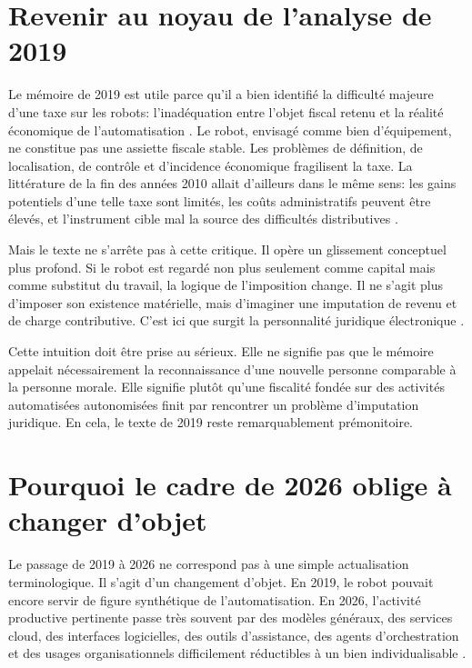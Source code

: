 \documentclass[11pt]{article}
\begin{document}
\section{Revenir au noyau de l'analyse de 2019}
Le m{\'e}moire de 2019 est utile parce qu'il a bien identifi{\'e} la difficult{\'e} majeure d'une taxe sur les robots: l'inad{\'e}quation entre l'objet fiscal retenu et la r{\'e}alit{\'e} {\'e}conomique de l'automatisation \citep{graz2019}. Le robot, envisag{\'e} comme bien d'{\'e}quipement, ne constitue pas une assiette fiscale stable. Les probl{\`e}mes de d{\'e}finition, de localisation, de contr{\^o}le et d'incidence {\'e}conomique fragilisent la taxe. La litt{\'e}rature de la fin des ann{\'e}es 2010 allait d'ailleurs dans le m{\^e}me sens: les gains potentiels d'une telle taxe sont limit{\'e}s, les co{\^u}ts administratifs peuvent {\^e}tre {\'e}lev{\'e}s, et l'instrument cible mal la source des difficult{\'e}s distributives \citep{guerreiro2019,thuemmel2018,gasteiger2017,acemoglu2018modeling}.

Mais le texte ne s'arr{\^e}te pas {\`a} cette critique. Il op{\`e}re un glissement conceptuel plus profond. Si le robot est regard{\'e} non plus seulement comme capital mais comme substitut du travail, la logique de l'imposition change. Il ne s'agit plus d'imposer son existence mat{\'e}rielle, mais d'imaginer une imputation de revenu et de charge contributive. C'est ici que surgit la personnalit{\'e} juridique {\'e}lectronique \citep{graz2019,oberson2017}.

Cette intuition doit {\^e}tre prise au s{\'e}rieux. Elle ne signifie pas que le m{\'e}moire appelait n{\'e}cessairement la reconnaissance d'une nouvelle personne comparable {\`a} la personne morale. Elle signifie plut{\^o}t qu'une fiscalit{\'e} fond{\'e}e sur des activit{\'e}s automatis{\'e}es autonomis{\'e}es finit par rencontrer un probl{\`e}me d'imputation juridique. En cela, le texte de 2019 reste remarquablement pr{\'e}monitoire.

\section{Pourquoi le cadre de 2026 oblige {\`a} changer d'objet}
Le passage de 2019 {\`a} 2026 ne correspond pas {\`a} une simple actualisation terminologique. Il s'agit d'un changement d'objet. En 2019, le robot pouvait encore servir de figure synth{\'e}tique de l'automatisation. En 2026, l'activit{\'e} productive pertinente passe tr{\`e}s souvent par des mod{\`e}les g{\'e}n{\'e}raux, des services cloud, des interfaces logicielles, des outils d'assistance, des agents d'orchestration et des usages organisationnels difficilement r{\'e}ductibles {\`a} un bien individualisable \citep{oecd2025adoption,oecd2025sme,brollo2024}.
\end{document}
